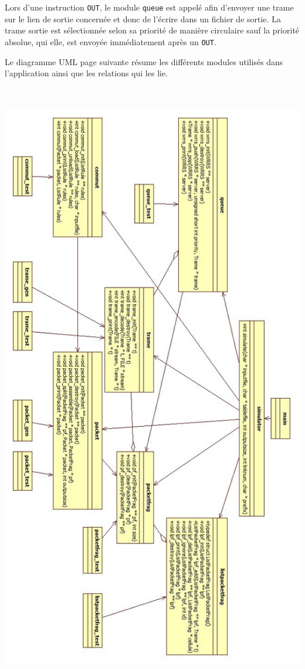 \documentclass[a4paper,11pt]{article}
\begin{document}
Lors d'une instruction \texttt{OUT}, le module \texttt{queue} est appelé afin d'envoyer une trame sur le lien de sortie concernée et donc de l'écrire dans un fichier de sortie. La trame sortie est sélectionnée selon sa priorité de manière circulaire sauf la priorité absolue, qui elle, est envoyée immédiatement après un \texttt{OUT}.

Le diagramme UML page suivante résume les différents modules utilisés dans l'application ainsi que les relations qui les lie.

\includegraphics[height=27cm]{UML.jpg}
\end{document}
